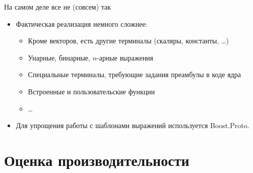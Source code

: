 \documentclass[@BEAMER_OPTIONS@]{beamer}
\begin{document}
\begin{frame}[fragile]{На самом деле все не (совсем) так}
    \begin{itemize}
        \item Фактическая реализация немного сложнее:
            \begin{itemize}
                \item Кроме векторов, есть другие терминалы (скаляры,
                    константы, \ldots)
                \item Унарные, бинарные, $n$-арные выражения
                \item Специальные терминалы, требующие задания
                    преамбулы в коде ядра
                \item Встроенные и пользовательские функции
                \item \ldots
            \end{itemize}
            \vspace{\baselineskip}
        \item Для упрощения работы с шаблонами выражений используется
            Boost.Proto.
    \end{itemize}
\end{frame}


\section{Оценка производительности}

\begin{frame}
    \sectionpage
\end{frame}
\end{document}

